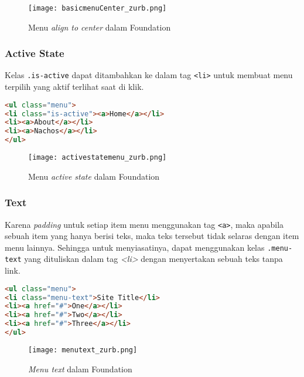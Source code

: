 \begin{figure} [H]
	\centering  
	\texttt{[image: basicmenuCenter\_zurb.png]}  
	\caption{Menu \textit{align to center} dalam Foundation}
	\label{fig:alignCenterFoundation}
\end{figure}

\subsubsection{Active State}
Kelas \texttt{.is-active} dapat ditambahkan ke dalam tag \texttt{<li>} untuk membuat menu terpilih yang aktif terlihat saat di klik. 

\begin{lstlisting}[language=HTML,  basicstyle=\ttfamily, frame=single, columns=fullflexible, keepspaces=true, breaklines=true, showstringspaces=false, label={lst:activeStateFoundation}, caption=Active State Foundation 6.] 
<ul class="menu">
<li class="is-active"><a>Home</a></li>
<li><a>About</a></li>
<li><a>Nachos</a></li>
</ul>
\end{lstlisting}

\begin{figure} [H]
	\centering  
	\texttt{[image: activestatemenu\_zurb.png]}  
	\caption{Menu \textit{active state} dalam Foundation}
	\label{fig:activeStateFoundation}
\end{figure}


\subsubsection{Text}
Karena \textit{padding} untuk setiap item menu menggunakan tag \texttt{<a>}, maka apabila sebuah item yang hanya berisi teks, maka teks tersebut tidak selaras dengan item menu lainnya. Sehingga untuk menyiasatinya, dapat menggunakan kelas \texttt{.menu-text} yang dituliskan dalam tag \textit{<li>} dengan menyertakan sebuah teks tanpa link.

\begin{lstlisting}[language=HTML,  basicstyle=\ttfamily, frame=single, columns=fullflexible, keepspaces=true, breaklines=true, showstringspaces=false, label={lst:textFoundation}, caption=Text Foundation 6.]
<ul class="menu">
<li class="menu-text">Site Title</li>
<li><a href="#">One</a></li>
<li><a href="#">Two</a></li>
<li><a href="#">Three</a></li>
</ul>
\end{lstlisting}

\begin{figure} [H]
	\centering  
	\texttt{[image: menutext\_zurb.png]}  
	\caption{\textit{Menu text} dalam Foundation}
	\label{fig:menuTextFoundation}
\end{figure}

